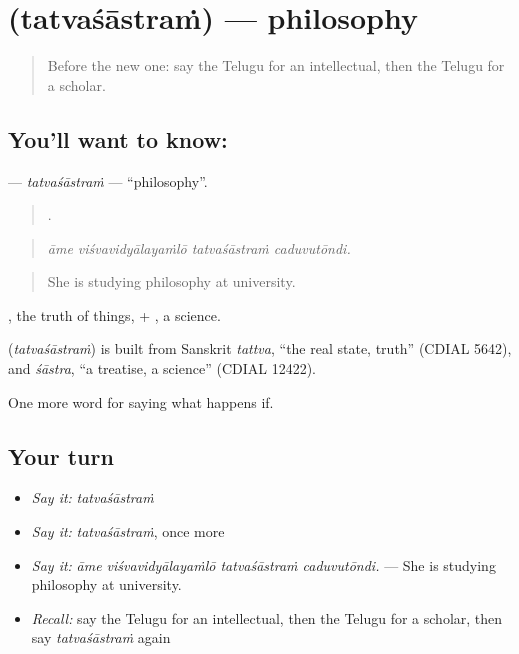 \section[\texorpdfstring{\te{తత్వశాస్త్రం} (tatvaśāstraṁ)}{తత్వశాస్త్రం (tatvaśāstraṁ)}]{ (tatvaśāstraṁ) — philosophy}

\label{lesson:TE-C435-tatvasastram}



\begin{quote}
Before the new one: say the Telugu for an intellectual, then the Telugu for a scholar.
\end{quote}

\subsection*{You'll want to know: }
\textbf{} — \emph{tatvaśāstraṁ} — \textquotedblleft{}philosophy\textquotedblright{}.

\begin{quote}
   .
\end{quote}

\begin{quote}
\emph{āme viśvavidyālayaṁlō tatvaśāstraṁ caduvutōndi.}
\end{quote}

\begin{quote}
She is studying philosophy at university.
\end{quote}

, the truth of things, + , a science.

\begin{cousinweb}
\textbf{} (\emph{tatvaśāstraṁ}) is built from Sanskrit \emph{tattva}, \textquotedblleft{}the real state, truth\textquotedblright{} (CDIAL 5642), and \emph{śāstra}, \textquotedblleft{}a treatise, a science\textquotedblright{} (CDIAL 12422).
\end{cousinweb}

\begin{grammarlens}[title={What you've built}]
One more word for saying what happens if.
\end{grammarlens}

\subsection*{Your turn}
\begin{itemize}
\raggedright
  \item \emph{Say it:} \emph{tatvaśāstraṁ}
  \item \emph{Say it:} \emph{tatvaśāstraṁ}, once more
  \item \emph{Say it:} \emph{āme viśvavidyālayaṁlō tatvaśāstraṁ caduvutōndi.} — She is studying philosophy at university.
  \item \emph{Recall:} say the Telugu for an intellectual, then the Telugu for a scholar, then say \emph{tatvaśāstraṁ} again
\end{itemize}


